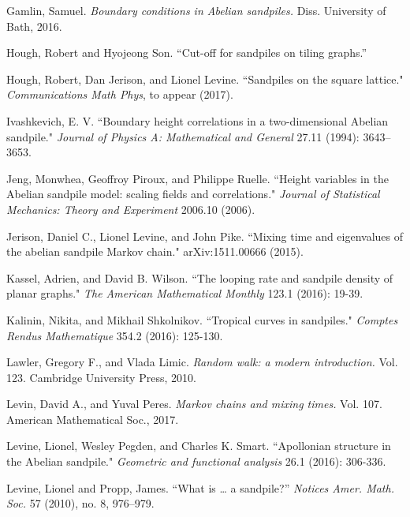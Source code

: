 \documentclass[a4paper, 12pt, notitlepage]{amsart}
\theoremstyle{remark}
\begin{document}
\begin{thebibliography}{1}
Gamlin, Samuel. 
\newblock \emph{Boundary conditions in Abelian sandpiles.}
\newblock Diss. University of Bath, 2016.

Hough, Robert and Hyojeong Son.
\newblock ``Cut-off for sandpiles on tiling graphs.'' 

Hough, Robert, Dan Jerison, and Lionel Levine. 
\newblock ``Sandpiles on the square lattice." 
\newblock \emph{Communications Math Phys}, to appear (2017).


Ivashkevich, E. V. 
\newblock ``Boundary height correlations in a two-dimensional Abelian sandpile." 
\newblock \emph{Journal of Physics A: Mathematical and General} 27.11 (1994): 3643--3653.


Jeng, Monwhea, Geoffroy Piroux, and Philippe Ruelle. 
\newblock ``Height variables in the Abelian sandpile model: scaling fields and correlations."
\newblock \emph{Journal of Statistical Mechanics: Theory and Experiment} 2006.10 (2006).

Jerison, Daniel C., Lionel Levine, and John Pike. 
\newblock ``Mixing time and eigenvalues of the abelian sandpile Markov chain." 
\newblock arXiv:1511.00666 (2015).



Kassel, Adrien, and David B. Wilson. 
\newblock``The looping rate and sandpile density of planar graphs." 
\newblock \emph{The American Mathematical Monthly} 123.1 (2016): 19-39.

Kalinin, Nikita, and Mikhail Shkolnikov. 
\newblock ``Tropical curves in sandpiles." 
\newblock \emph{Comptes Rendus Mathematique} 354.2 (2016): 125-130.

Lawler, Gregory F., and Vlada Limic. 
\newblock \emph{Random walk: a modern introduction.}
\newblock Vol. 123. Cambridge University Press, 2010.

Levin, David A., and Yuval Peres. 
\newblock \emph{Markov chains and mixing times.} Vol. 107. American Mathematical Soc., 2017.

Levine, Lionel, Wesley Pegden, and Charles K. Smart. 
\newblock ``Apollonian structure in the Abelian sandpile." 
\newblock \emph{Geometric and functional analysis} 26.1 (2016): 306-336.

Levine, Lionel and Propp, James.
\newblock ``What is … a sandpile?'' 
\newblock \emph{Notices Amer. Math. Soc.} 57 (2010), no. 8, 976–979. 


\end{thebibliography}
\end{document}
